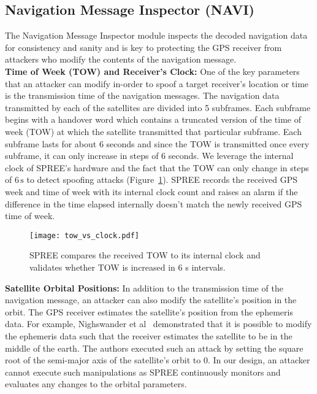 \documentclass[letterpaper,twocolumn,10pt]{article}
\newcommand{\unit}[1]{\ensuremath{\, \mathrm{#1}}}
\newcommand{\rxname}{SPREE\xspace}
\begin{document}
\subsection{Navigation Message Inspector (NAVI)}
\label{sec:nav-message-inspection}

The Navigation Message Inspector module inspects the decoded navigation data for consistency and sanity and is key to protecting the GPS receiver from attackers who modify the contents of the navigation message. \\

\noindent\textbf{Time of Week (TOW) and Receiver's Clock:}  One of the key parameters that an attacker can modify in-order to spoof a target receiver's location or time is the transmission time of the navigation messages. The navigation data transmitted by each of the satellites are divided into 5 subframes. Each subframe begins with a handover word which contains a truncated version of the time of week (TOW) at which the satellite transmitted that particular subframe. Each subframe lasts for about 6 seconds and since the TOW is transmitted once every subframe, it can only increase in steps of 6 seconds. We leverage the internal clock of \rxname's hardware and the fact that the TOW can only change in steps of $6\unit{s}$ to detect spoofing attacks (Figure~\ref{fig:tow_clock}). \rxname records the received GPS week and time of week with its internal clock count and raises an alarm if the difference in the time elapsed internally doesn't match the newly received GPS time of week. \\

\begin{figure}[t]
\centering
  \texttt{[image: tow\_vs\_clock.pdf]}
  \caption{\rxname compares the received TOW to its internal clock and validates whether TOW is increased in 6 s intervals.}
  \label{fig:tow_clock}
\end{figure}
\noindent\textbf{Satellite Orbital Positions:} In addition to the transmission time of the navigation message, an attacker can also modify the satellite's position in the orbit. The GPS receiver estimates the satellite's position from the ephemeris data. For example, Nighswander et al~\cite{NighswanderCCS2012} demonstrated that it is possible to modify the ephemeris data such that the receiver estimates the satellite to be in the middle of the earth. The authors executed such an attack by setting the square root of the semi-major axis of the satellite’s orbit to $0$. In our design, an attacker cannot execute such manipulations as \rxname continuously monitors and evaluates any changes to the orbital parameters.\\
\end{document}
